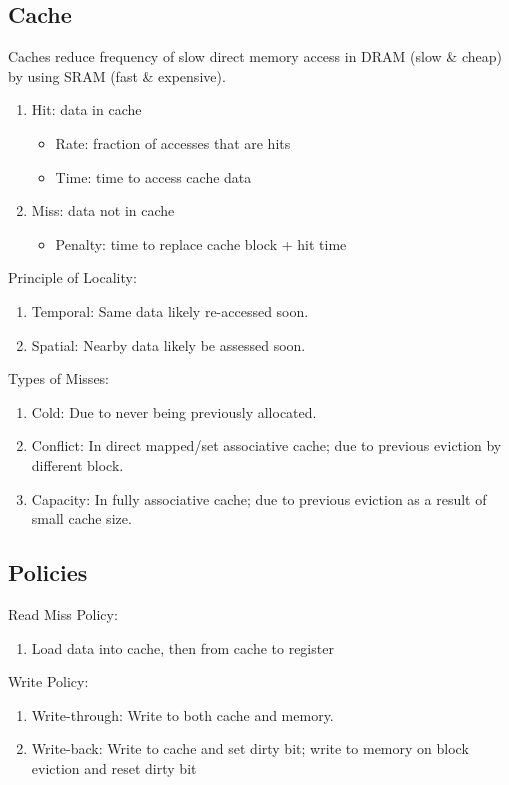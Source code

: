 \documentclass[12pt, a4paper]{article}
\begin{document}
\begin{multicols*}{3}
\section{Cache}
Caches reduce frequency of slow direct memory access in DRAM (slow \& cheap) by using SRAM (fast \& expensive).
\begin{enumerate}[\roman*.]
  \item Hit: data in cache 
    \begin{itemize}[leftmargin=*]
      \item Rate: fraction of accesses that are hits
      \item Time: time to access cache data
    \end{itemize}
  \item Miss: data not in cache
    \begin{itemize}[leftmargin=*]
      \item Penalty: time to replace cache block + hit time
    \end{itemize}
\end{enumerate}
{\centering{}\par}
Principle of Locality:
\begin{enumerate}[\roman*.]
  \item Temporal: Same data likely re-accessed soon.
  \item Spatial: Nearby data likely be assessed soon.
\end{enumerate}

Types of Misses:
\begin{enumerate}[\roman*.]
  \item Cold: Due to never being previously allocated.
  \item Conflict: In direct mapped/set associative cache; due to previous eviction by different block. 
  \item Capacity: In fully associative cache; due to previous eviction as a result of small cache size. 
\end{enumerate}
\vspace{-0.75em}
\subsection{Policies}
Read Miss Policy:
\begin{enumerate}[\roman*.]
  \item Load data into cache, then from cache to register
\end{enumerate}

Write Policy:
\begin{enumerate}[\roman*.]
  \item Write-through: Write to both cache and memory.
  \item Write-back: Write to cache and set dirty bit; write to memory on block eviction and reset dirty bit
\end{enumerate}


\end{multicols*}
\end{document}
